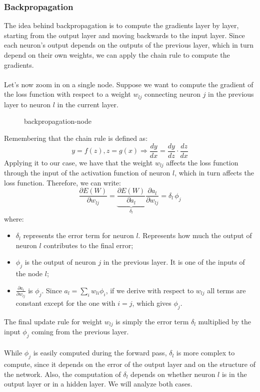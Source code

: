 \subsubsection{Backpropagation}
The idea behind backpropagation is to compute the gradients layer by layer, starting from the output layer and moving backwards to the input layer.
Since each neuron's output depends on the outputs of the previous layer, which in turn depend on their own weights, we can apply the chain rule to compute the gradients.
\\\\Let's now zoom in on a single node. Suppose we want to compute the gradient of the loss function with respect to a weight $w_{lj}$ 
connecting neuron $j$ in the previous layer to neuron $l$ in the current layer.
\begin{figure}[H]
    {backpropagation-node}
\end{figure}
Remembering that the chain rule is defined as:
\begin{equation*}
  y = f(z), z = g(x) \Rightarrow \frac{dy}{dx} = \frac{dy}{dz} \cdot \frac{dz}{dx}
\end{equation*}
Applying it to our case, we have that the weight $w_{lj}$ affects the loss function
through the input of the activation function of neuron $l$, which in turn affects the loss function. 
Therefore, we can write:
\[
\frac{\partial E(W)}{\partial w_{lj}}
= \underbrace{\frac{\partial E(W)}{\partial a_l}}_{\delta_l}
   \frac{\partial a_l}{\partial w_{lj}}
= \delta_l \, \phi_j
\]
where:
\begin{itemize}
    \item $\delta_l$ represents the error term for neuron $l$. 
    Represents how much the output of neuron $l$ contributes to the final error;
    \item $\phi_j$ is the output of neuron $j$ in the previous layer. It is one of the inputs of the node $l$;
    \item $\frac{\partial a_l}{\partial w_{lj}}$ is $\phi_j$. Since $a_l = \sum_{i} w_{li} \phi_i$,
    if we derive with respect to $w_{lj}$ all terms are constant except for the one with $i = j$, which gives $\phi_j$.
\end{itemize}
The final update rule for weight $w_{lj}$ is simply the error term $\delta_l$ multiplied by the input $\phi_j$ coming from the previous layer.
\\\\While $\phi_j$ is easily computed during the forward pass, $\delta_l$ is more complex to compute, since it depends on the error of the output layer 
and on the structure of the network.
Also, the computation of $\delta_l$ depends on whether neuron $l$ is in the output layer or in a hidden layer. We will analyze both cases.

